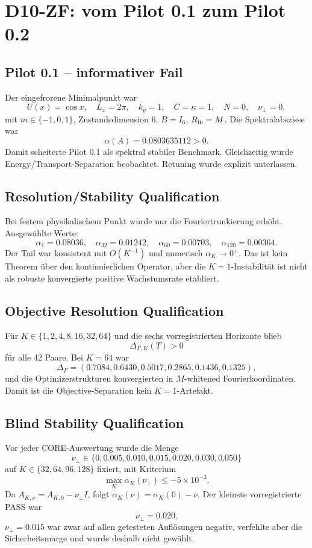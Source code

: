 \section{D10-ZF: vom Pilot 0.1 zum Pilot 0.2}
\subsection{Pilot 0.1 -- informativer Fail}
Der eingefrorene Minimalpunkt war
\[
U(x)=\cos x,\quad L_x=2\pi,\quad k_y=1,\quad C=\kappa=1,\quad N=0,\quad \nu_\perp=0,
\]
mit $m\in\{-1,0,1\}$, Zustandsdimension 6, $B=I_6$, $R_{\rm in}=M$. Die Spektralabszisse war
\[
\alpha(A)=0.0803635112>0.
\]
Damit scheiterte Pilot 0.1 als spektral stabiler Benchmark. Gleichzeitig wurde Energy/Transport-Separation beobachtet. Retuning wurde explizit unterlassen.

\subsection{Resolution/Stability Qualification}
Bei festem physikalischem Punkt wurde nur die Fouriertrunkierung erhöht. Ausgewählte Werte:
\[
\alpha_1=0.08036,\quad
\alpha_{32}=0.01242,\quad
\alpha_{60}=0.00703,\quad
\alpha_{120}=0.00364.
\]
Der Tail war konsistent mit $O(K^{-1})$ und numerisch $\alpha_K\to0^+$. Das ist kein Theorem über den kontinuierlichen Operator, aber die $K=1$-Instabilität ist nicht als robuste konvergierte positive Wachstumsrate etabliert.

\subsection{Objective Resolution Qualification}
Für $K\in\{1,2,4,8,16,32,64\}$ und die sechs vorregistrierten Horizonte blieb
\[
\Delta_{\Gamma,K}(T)>0
\]
für alle 42 Paare. Bei $K=64$ war
\[
\Delta_\Gamma=(0.7084,0.6430,0.5017,0.2865,0.1436,0.1325),
\]
und die Optimizerstrukturen konvergierten in $M$-whitened Fourierkoordinaten. Damit ist die Objective-Separation kein $K=1$-Artefakt.

\subsection{Blind Stability Qualification}
Vor jeder CORE-Auswertung wurde die Menge
\[
\nu_\perp\in\{0,0.005,0.010,0.015,0.020,0.030,0.050\}
\]
auf $K\in\{32,64,96,128\}$ fixiert, mit Kriterium
\[
\max_K\alpha_K(\nu_\perp)\le-5\times10^{-3}.
\]
Da $A_{K,\nu}=A_{K,0}-\nu_\perp I$, folgt $\alpha_K(\nu)=\alpha_K(0)-\nu$. Der kleinste vorregistrierte PASS war
\[
\boxed{\nu_\perp=0.020}.
\]
$\nu_\perp=0.015$ war zwar auf allen getesteten Auflösungen negativ, verfehlte aber die Sicherheitsmarge und wurde deshalb nicht gewählt.

